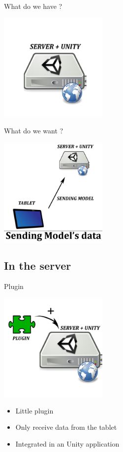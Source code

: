 \documentclass[a4paper,10pt]{beamer}
\begin{document}
			
		
			\begin{frame}{What do we have ?}
				\centerline{\includegraphics[height=150pt]{images/network/server.png}}
			\end{frame}
			
			\begin{frame}{What do we want ?}
				\centerline{\includegraphics[height=150pt]{images/network/sending_model.png}}
			\end{frame}
			
		\subsection{In the server}
			\begin{frame}{Plugin}
				\centerline{\includegraphics[height=150pt]{images/network/plugin.png}}
				\begin{itemize}	
					\item Little plugin
					\item Only receive data from the tablet
					\item Integrated in an Unity application
				\end{itemize}	
											
			\end{frame}
			
\end{document}
